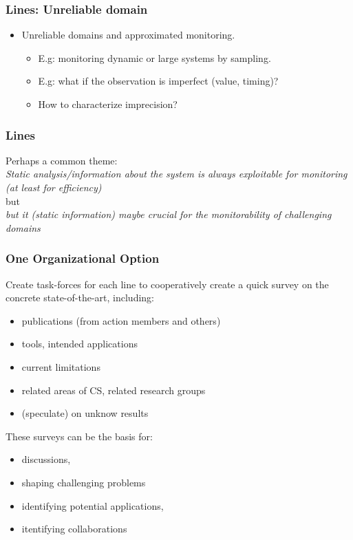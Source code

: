 \documentclass{beamer}
\begin{document}
\begin{frame}
  \frametitle{Lines: Unreliable domain}

  \begin{itemize}
  \item \alert{Unreliable} domains and \alert{approximated} monitoring.
    \begin{itemize}
      \item E.g: monitoring dynamic or large systems by sampling.
      \item E.g: what if the observation is imperfect (value, timing)?
      \item How to characterize imprecision?
    \end{itemize}
  \end{itemize}
\end{frame}

\begin{frame}
  \frametitle{Lines}

  Perhaps a common theme:\\[1em]

  \textit{Static analysis/information about the system is always
    exploitable for monitoring (at least for efficiency)}\\[1em]

  but\\[1em]

  \textit{but it (static information) maybe crucial for the monitorability of 
    challenging domains }
\end{frame}


\begin{frame}
  \frametitle{One Organizational Option}

  Create task-forces for \alert{each line} to cooperatively create a
  quick survey on the concrete state-of-the-art, including:
  \begin{itemize}
    \item publications (from action members and others)
    \item tools, intended applications
    \item current limitations
    \item related areas of CS, related research groups
    \item (speculate) on unknow results
  \end{itemize}

  These surveys can be the basis for:
  \begin{itemize}
  \item discussions, 
  \item shaping challenging problems 
  \item identifying potential applications,
  \item itentifying collaborations
  \end{itemize}
    
\end{frame}
\end{document}
